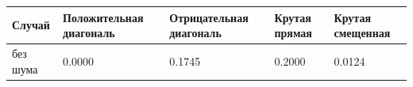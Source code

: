 \begin{tabular}{|l|l|l|l|l|}
\hline
Случай & Положительная диагональ & Отрицательная диагональ & Крутая прямая & Крутая смещенная \\
\hline
без шума & 0.0000 & 0.1745 & 0.2000 & 0.0124 \\
\hline
\end{tabular}
